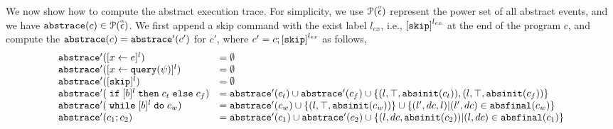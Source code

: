  
  We now show how to compute the abstract execution trace. 
  For simplicity, we use $\mathcal{P}(\stackrel{\scriptscriptstyle{\alpha}}{\mathtt{\epsilon}{}})$ represent the power set of all abstract events, and we have $\mathtt{abs}{\mathtt{trace}}(c) \in \mathcal{P}(\stackrel{\scriptscriptstyle{\alpha}}{\mathtt{\epsilon}{}})$.
 We first append a skip command with 
the exist label $l_{ex}$, i.e., $\clabel{\eskip}^{l_{ex}}$ at the end of the program $c$, 
and compute the $\mathtt{abs}{\mathtt{trace}}(c) = \mathtt{abs}{\mathtt{trace}}'(c')$ for $c'$, where $c' = c;\clabel{\eskip}^{l_{ex}}$ as follows,
 {\footnotesize
 \[
   \begin{array}{ll}
      \absflow'(\clabel{\assign{x}{\expr}}{}^l)  & = \emptyset  \\
      \absflow'(\clabel{\assign{x}{\query(\qexpr)}}{}^l)  & = \emptyset  \\
      \absflow'([\eskip]^{l})  & = \emptyset \\
      \absflow'(\eif [b]^l \ethen c_t \eelse c_f)  & =  \absflow'(c_t) \cup \absflow'(c_f)
        \cup \{(l, \top,  \absinit(c_t) ) ,  (l, \top, \absinit(c_f)) \} \\
       \absflow'(\ewhile [b]^l \edo c_w)  & =  \absflow'(c_w) \cup \{(l, \top, \absinit(c_w)) \} 
       \cup \{(l', dc, l)| (l', dc) \in \absfinal(c_w) \} \\
       \absflow'(c_1 ; c_2)  & = \absflow'(c_1) \cup  \absflow'(c_2) 
       \cup \{ (l, dc, \absinit(c_2)) | (l, dc) \in \absfinal(c_1) \} \\
   \end{array}
   \]
   }

